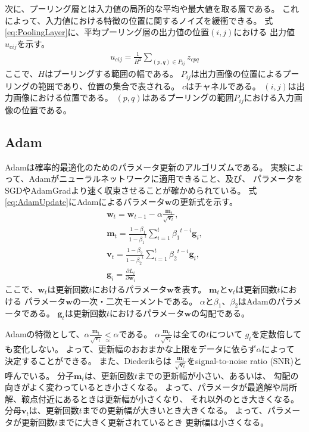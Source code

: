 次に、プーリング層とは入力値の局所的な平均や最大値を取る層である。
これによって、入力値における特徴の位置に関するノイズを緩衝できる。
式\ref{eq:PoolingLayer}に、平均プーリング層の出力値の位置$(i, j)$における
出力値$u_{cij}$を示す。
\begin{gather} \label{eq:PoolingLayer}
  u_{cij} = \frac{1}{H^2} \sum_{(p, q) \in P_{ij}} z_{cpq}
\end{gather}
ここで、$H$はプーリングする範囲の幅である。
$P_{ij}$は出力画像の位置によるプーリングの範囲であり、位置の集合で表される。
$c$はチャネルである。
$(i, j)$は出力画像における位置である。
$(p, q)$はあるプーリングの範囲$P_{ij}$における入力画像の位置である。


\subsection{Adam}

Adam\cite{diederik15}は確率的最適化のためのパラメータ更新のアルゴリズムである。
実験によって、Adamがニューラルネットワークに適用できること、及び、
パラメータをSGDやAdamGradより速く収束させることが確かめられている。
式\ref{eq:AdamUpdate}にAdamによるパラメータ$\mathbf{w}$の更新式を示す。
\begin{gather} \label{eq:AdamUpdate}
  \mathbf{w}_t = \mathbf{w}_{t - 1}
                 - \alpha \frac{\mathbf{m}_t}{\sqrt{\mathbf{v}_t}}, \\
  \mathbf{m}_t = \frac{1 - \beta_1}{1 - {\beta_1}^t}
                 \sum^t_{i = 1} {\beta_1}^{t - i} \mathbf{g}_i, \nonumber \\
  \mathbf{v}_t = \frac{1 - \beta_2}{1 - {\beta_2}^t}
                 \sum^t_{i = 1} {\beta_2}^{t - i} \mathbf{g}_i, \nonumber \\
  \mathbf{g}_i = \frac{\partial L_i}{\partial \mathbf{w}_i} \nonumber
\end{gather}
ここで、$\mathbf{w}_t$は更新回数$t$におけるパラメータ$\mathbf{w}$を表す。
$\mathbf{m}_t$と$\mathbf{v}_t$は更新回数$t$における
パラメータ$\mathbf{w}$の一次・二次モーメントである。
$\alpha$と$\beta_1$、$\beta_2$はAdamのパラメータである。
$\mathbf{g}_t$は更新回数$t$におけるパラメータ$\mathbf{w}$の勾配である。

Adamの特徴として、$\alpha \frac{\mathbf{m}_t}{\sqrt{\mathbf{v}_t}}
\underset{\approx}{<} \alpha$である。
$\alpha \frac{\mathbf{m}_t}{\sqrt{\mathbf{v}_t}}$は全ての$t$について
$g_t$を定数倍しても変化しない。
よって、更新幅のおおまかな上限をデータに依らず$\alpha$によって
決定することができる。
また、Diederikら\cite{diederik15}は
$\frac{\mathbf{m}_t}{\sqrt{\mathbf{v}_t}}$をsignal-to-noise ratio (SNR)と
呼んでいる。
分子$\mathbf{m}_t$は、更新回数$t$までの更新幅が小さい、あるいは、
勾配の向きがよく変わっているとき小さくなる。
よって、パラメータが最適解や局所解、鞍点付近にあるときは更新幅が小さくなり、
それ以外のとき大きくなる。
分母$\mathbf{v}_t$は、更新回数$t$までの更新幅が大きいとき大きくなる。
よって、パラメータが更新回数$t$までに大きく更新されているとき
更新幅は小さくなる。
